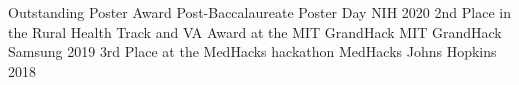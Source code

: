 



\begin{cvhonors}

  \cvhonor
    {Outstanding Poster Award}
    {Post-Baccalaureate Poster Day}
    {NIH}
    {2020}
  \cvhonor 
    {2nd Place in the Rural Health Track and VA Award at the MIT GrandHack}
    {MIT GrandHack}
    {Samsung}
    {2019}
  \cvhonor
    {3rd Place at the MedHacks hackathon} %
    {MedHacks} %
    {Johns Hopkins} %
    {2018} %

\end{cvhonors}






